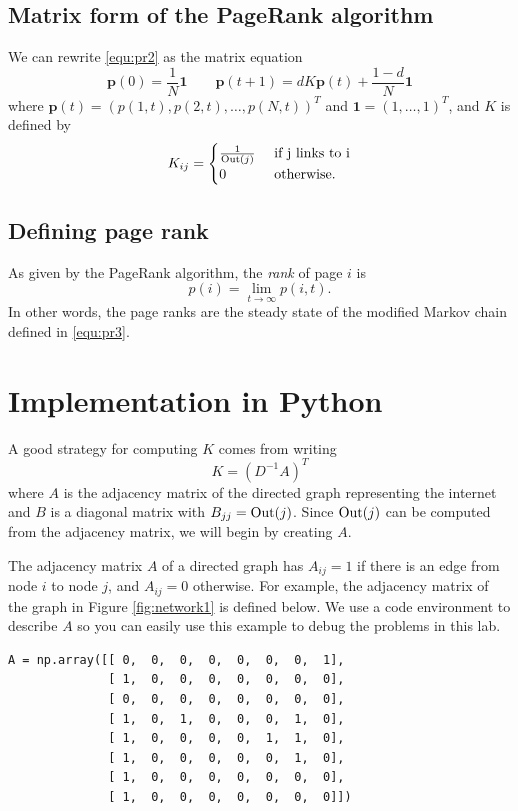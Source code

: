 \subsection*{Matrix form of the PageRank algorithm}
We can rewrite \eqref{equ:pr2} as the matrix equation
\begin{equation}\label{equ:pr3}
\mathbf{p}(0)=\frac{1}{N}\mathbf{1} \qquad \mathbf{p}(t+1) = dK\mathbf{p}(t) + \frac{1-d}{N}\mathbf{1}
\end{equation}
where $\mathbf{p}(t)=(p(1,t), p(2,t), \ldots, p(N,t))^T$ and $\mathbf{1} = (1,\ldots, 1)^T$, and $K$ is defined by
\[K_{ij} = \begin{cases} \frac{1}{\operatorname{Out}(j)} & \mbox{ if j links to i} \\
	0 & \mbox{ otherwise.} \end{cases}\]


\subsection*{Defining page rank}
As given by the PageRank algorithm, the \emph{rank} of page $i$ is
\[p(i) = \lim_{t\to \infty} p(i,t).\]
In other words, the page ranks are the steady state of the modified Markov chain defined in \eqref{equ:pr3}.



\section*{Implementation in Python}
A good strategy for computing $K$ comes from writing
\[
K = (D^{-1}A)^T
\]
where $A$ is the adjacency matrix of the directed graph representing the internet and $B$ is a diagonal matrix with $B_{jj}=\operatorname{Out}(j)$.
Since $\operatorname{Out}(j)$ can be computed from the adjacency matrix, we will begin by creating $A$.

The adjacency matrix $A$ of a directed graph has $A_{ij}=1$ if there is an edge from node $i$ to node $j$, and $A_{ij}=0$ otherwise.
For example, the adjacency matrix of the graph in Figure \ref{fig:network1} is defined below.
We use a code environment to describe $A$ so you can easily use this example to debug the problems in this lab.
\begin{lstlisting}
A = np.array([[ 0,  0,  0,  0,  0,  0,  0,  1],
              [ 1,  0,  0,  0,  0,  0,  0,  0],
              [ 0,  0,  0,  0,  0,  0,  0,  0],
              [ 1,  0,  1,  0,  0,  0,  1,  0],
              [ 1,  0,  0,  0,  0,  1,  1,  0],
              [ 1,  0,  0,  0,  0,  0,  1,  0],
              [ 1,  0,  0,  0,  0,  0,  0,  0],
              [ 1,  0,  0,  0,  0,  0,  0,  0]])
\end{lstlisting}



